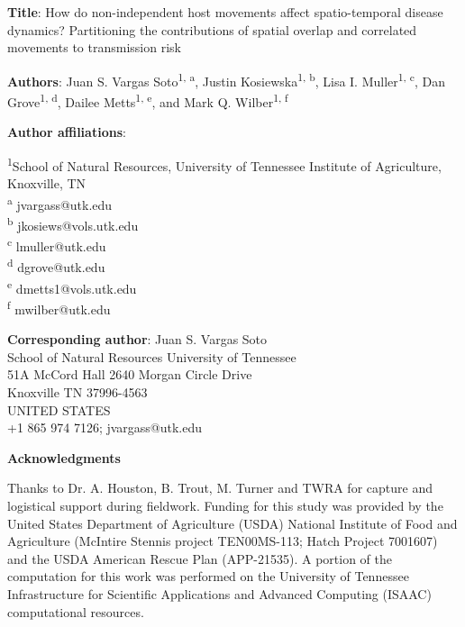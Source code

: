 \documentclass[letterpaper]{article}
\begin{document}
\noindent
\textbf{Title}: How do non-independent host movements affect spatio-temporal disease dynamics? Partitioning the contributions of spatial overlap and correlated movements to transmission risk

\bigskip

\noindent

\bigskip

\noindent
\textbf{Authors}: Juan S. Vargas Soto\textsuperscript{1, a}, Justin Kosiewska\textsuperscript{1, b}, Lisa I. Muller\textsuperscript{1, c}, Dan Grove\textsuperscript{1, d}, Dailee Metts\textsuperscript{1, e}, and Mark Q. Wilber\textsuperscript{1, f}

\bigskip

\noindent
\textbf{Author affiliations}:

\noindent
\textsuperscript{1}School of Natural Resources, University of Tennessee Institute of Agriculture, Knoxville, TN \\
\textsuperscript{a} jvargass@utk.edu\\
\textsuperscript{b} jkosiews@vols.utk.edu\\
\textsuperscript{c} lmuller@utk.edu\\
\textsuperscript{d} dgrove@utk.edu\\
\textsuperscript{e} dmetts1@vols.utk.edu\\
\textsuperscript{f} mwilber@utk.edu

\bigskip

\noindent
\textbf{Corresponding author}: Juan S. Vargas Soto\\
School of Natural Resources University of Tennessee\\
51A McCord Hall 2640 Morgan Circle Drive\\
Knoxville TN 37996-4563\\
UNITED STATES\\
+1 865 974 7126; jvargass@utk.edu
\bigskip

\noindent
\textbf{Acknowledgments}

Thanks to Dr. A. Houston, B. Trout, M. Turner and TWRA for capture and logistical support during fieldwork. Funding for this study was provided by the United States Department of Agriculture (USDA) National Institute of Food and Agriculture (McIntire Stennis project TEN00MS-113; Hatch Project 7001607) and the USDA American Rescue Plan (APP-21535). A portion of the computation for this work was performed on the University of Tennessee Infrastructure for Scientific Applications and Advanced Computing (ISAAC) computational resources.
\bigskip
\end{document}
